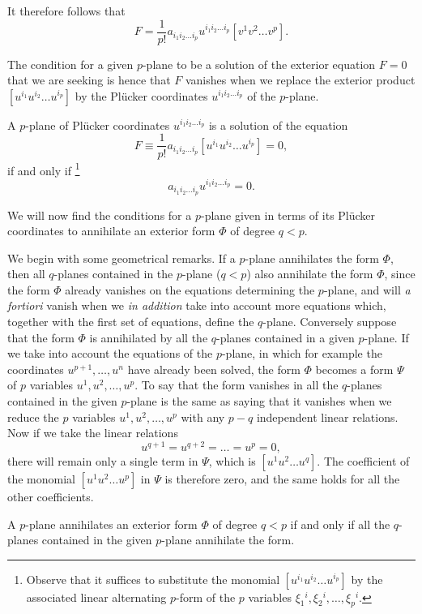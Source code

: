 It therefore follows that
\[
F=\frac{1}{p!}a_{i_{1}i_{2}\dots i_{p}}u^{i_{1}i_{2}\dots i_{p}}[v^{1}v^{2}\dots v^{p}].
\]

The condition for a given $p$-plane to be a solution of the exterior equation $F=0$ that we are seeking is hence that $F$ vanishes when we replace the exterior product $[u^{i_{1}}u^{i_{2}}\dots u^{i_{p}}]$ by the Pl\"ucker coordinates $u^{i_{1}i_{2}\dots i_{p}}$ of the $p$-plane.
\begin{thm*}
  A $p$-plane of Pl\"ucker coordinates $u^{i_{1}i_{2}\dots i_{p}}$ is a solution of the equation
\[
F\equiv\frac{1}{p!}a_{i_{1}i_{2}\dots i_{p}}[u^{i_{1}}u^{i_{2}}\dots u^{i_{p}}]=0,
\]
if and only if \footnote{Observe that it suffices to substitute the monomial $[u^{i_{1}}u^{i_{2}}\dots u^{i_{p}}]$ by the associated linear alternating $p$-form of the $p$ variables  $\xi_{1}{}^{i},\xi_{2}{}^{i},\dots,\xi_{p}{}^{i}$.}
\[
a_{i_{1}i_{2}\dots i_{p}}u^{i_{1}i_{2}\dots i_{p}}=0.
\]
\end{thm*}

\vspace{12pt}\fsec We will now find the conditions for a $p$-plane given in terms of its Pl\"ucker coordinates to annihilate an exterior form $\Phi$ of degree $q<p$.

We begin with some geometrical remarks. If a $p$-plane annihilates the form $\Phi$, then all $q$-planes contained in the $p$-plane ($q<p$) also annihilate the form $\Phi$, since the form $\Phi$ already vanishes on the equations determining the $p$-plane, and will \emph{a fortiori} vanish when we \emph{in addition} take into account more equations which, together with the first set of equations, define the $q$-plane. Conversely suppose that the form $\Phi$ is annihilated by all the $q$-planes contained in a given $p$-plane. If we take into account the equations of the $p$-plane, in which for example the coordinates $u^{p+1},\dots,u^{n}$ have already been solved, the form $\Phi$ becomes a form $\Psi$ of $p$ variables $u^{1},u^{2},\dots,u^{p}$. To say that the form vanishes in all the $q$-planes contained in the given $p$-plane is the same as saying that it vanishes when we reduce the $p$ variables $u^{1},u^{2},\dots,u^{p}$ with any $p-q$ independent linear relations. Now if we take the linear relations
\[
u^{q+1}=u^{q+2}=\dots=u^{p}=0,
\]
there will remain only a single term in $\Psi$, which is $[u^{1}u^{2}\dots u^{q}]$. The coefficient of the monomial $[u^{1}u^{2}\dots u^{p}]$ in $\Psi$ is therefore zero, and the same holds for all the other coefficients.
\begin{thm*}
  A $p$-plane  annihilates an exterior form $\Phi$ of degree $q<p$ if and only if all the $q$-planes contained in the given $p$-plane annihilate the form.
\end{thm*}

